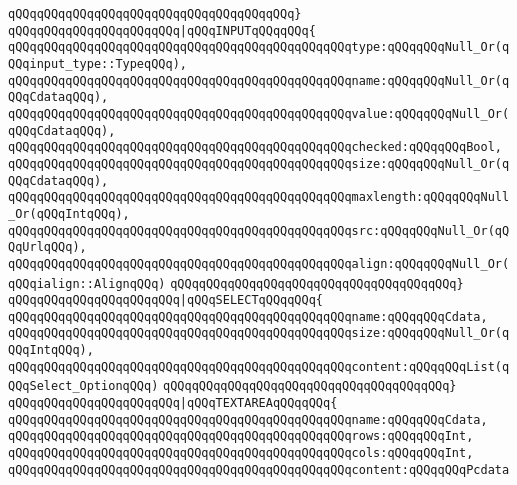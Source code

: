 \verb|qQQqqQQqqQQqqQQqqQQqqQQqqQQqqQQqqQQqqQQq}|\newline
\verb|qQQqqQQqqQQqqQQqqQQqqQQq|\verb#|qQQqINPUTqQQqqQQq{#\newline
\verb|qQQqqQQqqQQqqQQqqQQqqQQqqQQqqQQqqQQqqQQqqQQqqQQqtype:qQQqqQQqNull_Or(qQQqinput_type::TypeqQQq),|\newline
\verb|qQQqqQQqqQQqqQQqqQQqqQQqqQQqqQQqqQQqqQQqqQQqqQQqname:qQQqqQQqNull_Or(qQQqCdataqQQq),|\newline
\verb|qQQqqQQqqQQqqQQqqQQqqQQqqQQqqQQqqQQqqQQqqQQqqQQqvalue:qQQqqQQqNull_Or(qQQqCdataqQQq),|\newline
\verb|qQQqqQQqqQQqqQQqqQQqqQQqqQQqqQQqqQQqqQQqqQQqqQQqchecked:qQQqqQQqBool,|\newline
\verb|qQQqqQQqqQQqqQQqqQQqqQQqqQQqqQQqqQQqqQQqqQQqqQQqsize:qQQqqQQqNull_Or(qQQqCdataqQQq),|\newline
\verb|qQQqqQQqqQQqqQQqqQQqqQQqqQQqqQQqqQQqqQQqqQQqqQQqmaxlength:qQQqqQQqNull_Or(qQQqIntqQQq),|\newline
\verb|qQQqqQQqqQQqqQQqqQQqqQQqqQQqqQQqqQQqqQQqqQQqqQQqsrc:qQQqqQQqNull_Or(qQQqUrlqQQq),|\newline
\verb|qQQqqQQqqQQqqQQqqQQqqQQqqQQqqQQqqQQqqQQqqQQqqQQqalign:qQQqqQQqNull_Or(qQQqialign::AlignqQQq)|\newline
\verb|qQQqqQQqqQQqqQQqqQQqqQQqqQQqqQQqqQQqqQQq}|\newline
\verb|qQQqqQQqqQQqqQQqqQQqqQQq|\verb#|qQQqSELECTqQQqqQQq{#\newline
\verb|qQQqqQQqqQQqqQQqqQQqqQQqqQQqqQQqqQQqqQQqqQQqqQQqname:qQQqqQQqCdata,|\newline
\verb|qQQqqQQqqQQqqQQqqQQqqQQqqQQqqQQqqQQqqQQqqQQqqQQqsize:qQQqqQQqNull_Or(qQQqIntqQQq),|\newline
\verb|qQQqqQQqqQQqqQQqqQQqqQQqqQQqqQQqqQQqqQQqqQQqqQQqcontent:qQQqqQQqList(qQQqSelect_OptionqQQq)|\newline
\verb|qQQqqQQqqQQqqQQqqQQqqQQqqQQqqQQqqQQqqQQq}|\newline
\verb|qQQqqQQqqQQqqQQqqQQqqQQq|\verb#|qQQqTEXTAREAqQQqqQQq{#\newline
\verb|qQQqqQQqqQQqqQQqqQQqqQQqqQQqqQQqqQQqqQQqqQQqqQQqname:qQQqqQQqCdata,|\newline
\verb|qQQqqQQqqQQqqQQqqQQqqQQqqQQqqQQqqQQqqQQqqQQqqQQqrows:qQQqqQQqInt,|\newline
\verb|qQQqqQQqqQQqqQQqqQQqqQQqqQQqqQQqqQQqqQQqqQQqqQQqcols:qQQqqQQqInt,|\newline
\verb|qQQqqQQqqQQqqQQqqQQqqQQqqQQqqQQqqQQqqQQqqQQqqQQqcontent:qQQqqQQqPcdata|\newline
